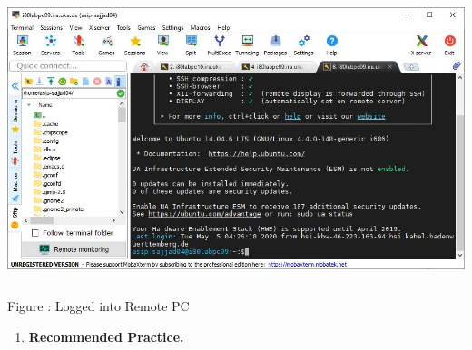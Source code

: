 \documentclass[
]{article}
\begin{document}
\includegraphics[width=5.70556in,height=3.27527in]{images/media/image4.JPG}

Figure : Logged into Remote PC

\begin{enumerate}
\def\labelenumi{\Alph{enumi}.}
\setcounter{enumi}{2}
\item
  \textbf{Recommended Practice.}
\end{enumerate}
\end{document}
